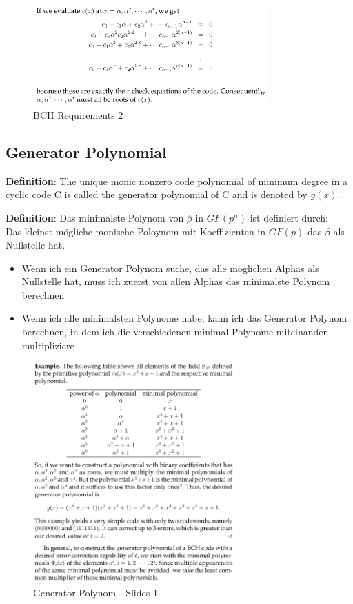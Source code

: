 \begin{figure}[H]
\centering
\includegraphics[width=0.8\textwidth]{figures/bchRequirement2.png}
\caption{BCH Requirements 2}
\end{figure}

\hypertarget{generator-polynomial}{%
\subsection{Generator Polynomial}\label{generator-polynomial}}

\textbf{Definition}: The unique monic nonzero code polynomial of minimum
degree in a cyclic code C is called the generator polynomial of C and is
denoted by $g(x)$.

\textbf{Definition}: Das minimalste Polynom von $\beta$ in $GF(p^n)$ ist
definiert durch:\\
Das kleinst mögliche monische Poloynom mit Koeffizienten in $GF(p)$ das $\beta$ als Nullstelle hat.

\begin{itemize}
\tightlist
\item
  Wenn ich ein Generator Polynom suche, das alle möglichen Alphas als
  Nullstelle hat, muss ich zuerst von allen Alphas das minimalste
  Polynom berechnen
\item
  Wenn ich alle minimalsten Polynome habe, kann ich das Generator
  Polynom berechnen, in dem ich die verschiedenen minimal Polynome
  miteinander multipliziere
\end{itemize}

\begin{figure}[H]
\centering
\includegraphics[width=0.7\textwidth]{figures/generatorPolynomial2.png}
\caption{Generator Polynom - Slides 1}
\end{figure}

